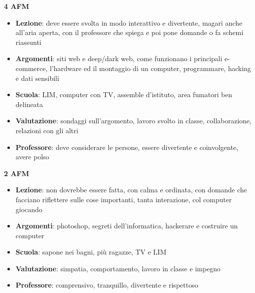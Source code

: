\documentclass{article}
\begin{document}
	\begin{center}
	\end{center}
	
	\begin{center}
	\textbf{4 AFM}
	\end{center}
	\begin{itemize}
	\item \textbf{Lezione}: deve essere svolta in modo interattivo e divertente, magari anche all'aria aperta, con il professore che spiega e poi pone domande o fa schemi riassunti
	\item \textbf{Argomenti}: siti web e deep/dark web, come funzionano i principali e-commerce, l'hardware ed il montaggio di un computer, programmare, hacking e dati sensibili
	\item \textbf{Scuola}: LIM, computer con TV, assemble d'istituto, area fumatori ben delineata
	\item \textbf{Valutazione}: sondaggi sull'argomento, lavoro svolto in classe, collaborazione, relazioni con gli altri
	\item \textbf{Professore}: deve considerare le persone, essere divertente e coinvolgente, avere polso
	\end{itemize}
	
	\begin{center}
	\textbf{2 AFM}
	\end{center}
	\begin{itemize}
	\item \textbf{Lezione}: non dovrebbe essere fatta, con calma e ordinata, con domande che facciano riflettere sulle cose importanti, tanta interazione, col computer giocando
	\item \textbf{Argomenti}: photoshop, segreti dell'informatica, hackerare e costruire un computer
	\item \textbf{Scuola}: sapone nei bagni, più ragazze, TV e LIM
	\item \textbf{Valutazione}: simpatia, comportamento, lavoro in classe e impegno
	\item \textbf{Professore}: comprensivo, tranquillo, divertente e rispettoso
	\end{itemize}
	
\end{document}
